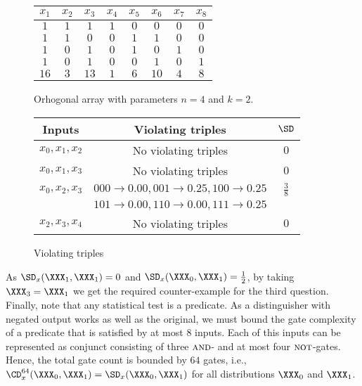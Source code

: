 \documentclass{crypto-exercise}
\begin{document}
\begin{solution}
\begin{figure}[!t]
  \centering
  \begin{small}
  \begin{tabular}{|c|c|c|c|c|c|c|c|}
  \hline
  $x_1$ & $x_2$ & $x_3$ & $x_4$ & $x_5$ & $x_6$ & $x_7$ & $x_8$ \\
  \hline
  $1$   & $1$  & $1$   & $1$   & $0$   & $0$  & $0$   & $0$   \\
  $1$   & $1$  & $0$   & $0$   & $1$   & $1$  & $0$   & $0$   \\
  $1$   & $0$  & $1$   & $0$   & $1$   & $0$  & $1$   & $0$   \\
  $1$   & $0$  & $1$   & $0$   & $0$   & $1$  & $0$   & $1$   \\
  \hline 
  $16$  & $3$  & $13$  & $1$   & $6$   & $10$ & $4$   & $8$   \\
  \hline
  \end{tabular}
  \end{small}
  \caption{Orhogonal array with parameters $n=4$ and $k=2$.}
  \label{fig:orthogonal-array}
\end{figure}
\begin{figure}[!h]
  \centering
  \begin{small}
  \begin{tabular}[sdf]{|c|c|c|}
    \hline
    Inputs & Violating triples & $\SD$\\
    \hline
    $x_0,x_1,x_2$ &  No violating triples & $0$\\
    $x_0,x_1,x_3$ &  No violating triples & $0$\\
    $x_0,x_2,x_3$ &  $000\to 0.00, 001\to 0.25, 100\to 0.25$ & $\frac{3}{8}$\\
                 &  $101\to 0.00, 110\to 0.00, 111\to 0.25$ & \\
    $x_2,x_3,x_4$ &  No violating triples & $0$\\
    \hline
  \end{tabular}
  \end{small}
  \caption{Violating triples}
  \label{fig:violating-triples}
\end{figure}

As $\SD_x(\XXX_1,\XXX_1)=0$ and $\SD_x(\XXX_0,\XXX_1)=\frac{1}{2}$, by
taking $\XXX_3=\XXX_1$ we get the required counter-example for the
third question.  Finally, note that any statistical test is a
predicate. As a distinguisher with negated output works as well as the
original, we must bound the gate complexity of a predicate that is
satisfied by at most $8$ inputs. Each of this inputs can be
represented as conjunct consisting of three $\textsc{and}$- and at
most four $\textsc{not}$-gates. Hence, the total gate count is bounded
by $64$ gates, i.e., $\CD_x^{64}(\XXX_0,\XXX_1)=\SD_x(\XXX_0,\XXX_1)$
for all distributions $\XXX_0$ and $\XXX_1$.

\end{solution}
\end{document}
